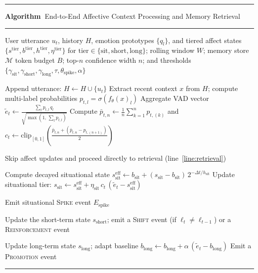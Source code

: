 \documentclass[graybox]{svmult}
\newenvironment{breakablealgorithm}
{%
    \par\medskip
    \refstepcounter{algorithm}%
    \hrule\vspace{2pt}%
    \renewcommand{\caption}[1]{%
        \noindent\textbf{Algorithm~\thealgorithm}\enspace ##1\par
        \vspace{2pt}\hrule\vspace{2pt}%
    }%
}
{%
    \vspace{2pt}\hrule
    \par\medskip
}
\begin{document}
\begin{breakablealgorithm}
\small
\caption{End-to-End Affective Context Processing and Memory Retrieval}
\label{alg:pipeline}
\begin{algorithmic}[1]

    \Require User utterance $u_t$, history $H$, emotion prototypes $\{q_l\}$,
    and tiered affect states $\{s^{\text{tier}}, b^{\text{tier}},
    h^{\text{tier}}, \eta^{\text{tier}}\}$
    \Statex \qquad for $\text{tier} \in \{\text{sit}, \text{short},
    \text{long}\}$; rolling window $W$; memory store $\mathcal{M}$
    \Statex \qquad token budget $B$; top-$n$ confidence width $n$; and
    thresholds $\{\gamma_{\text{sit}}, \gamma_{\text{short}},
    \gamma_{\text{long}}, \tau, \theta_{\text{spike}}, \alpha\}$

    \State Append utterance: $H \gets H \cup \{u_t\}$
    \State Extract recent context $x$ from $H$; compute multi-label probabilities $p_{t,l} = \sigma(f_\theta(x)_l)$
    \State Aggregate VAD vector $\tilde{e}_t \gets \frac{\sum_l p_{t,l}\, q_l}{\sqrt{\max\!\left(1,\, \sum_l p_{t,l}\right)}}$
    \State Compute $\bar{p}_{t,n} \gets \frac{1}{n}\sum_{k=1}^{n}p_{t,(k)}$ and $c_t \gets \text{clip}_{[0,1]}\!\left(\frac{\bar{p}_{t,n}+(\bar{p}_{t,n}-p_{t,(n+1)})}{2}\right)$

        \State Skip affect updates and proceed directly to retrieval (line~\ref{line:retrieval})
    \EndIf

    \State Compute decayed situational state $s^{\text{eff}}_{\text{sit}} \gets b_{\text{sit}} + (s_{\text{sit}} - b_{\text{sit}})\, 2^{-\Delta t / h_{\text{sit}}}$
    \State Update situational tier: $s_{\text{sit}} \gets s^{\text{eff}}_{\text{sit}} + \eta_{\text{sit}}\, c_t\, (\tilde{e}_t - s^{\text{eff}}_{\text{sit}})$

        \State Emit situational \textsc{Spike} event $E_{\text{spike}}$
    \EndIf

        \State Update the short-term state $s_{\text{short}}$; emit a \textsc{Shift} event (if $\ell_t \neq \ell_{t-1}$) or a \textsc{Reinforcement} event
    \EndIf

        \State Update long-term state $s_{\text{long}}$; adapt baseline $b_{\text{long}} \gets b_{\text{long}} + \alpha\,(\tilde{e}_t - b_{\text{long}})$
        \State Emit a \textsc{Promotion} event
    \EndIf


\end{algorithmic}
\end{breakablealgorithm}
\end{document}
